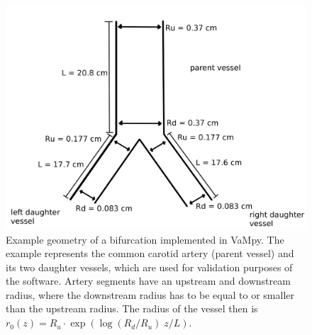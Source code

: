 \documentclass{jors}
\begin{document}
\begin{figure}
  \center
  \includegraphics[width=\linewidth]{figures/geometry.png}
  \caption{Example geometry of a bifurcation implemented in VaMpy. The example represents the common carotid artery (parent vessel) and its two daughter vessels, which are used for validation purposes of the software. Artery segments have an upstream and downstream radius, where the downstream radius has to be equal to or smaller than the upstream radius. The radius of the vessel then is $r_0(z) = R_u \cdot \exp ( \log ( R_d/R_u ) \; z/L )$. \label{fig:geometry}}
\end{figure}
\end{document}
